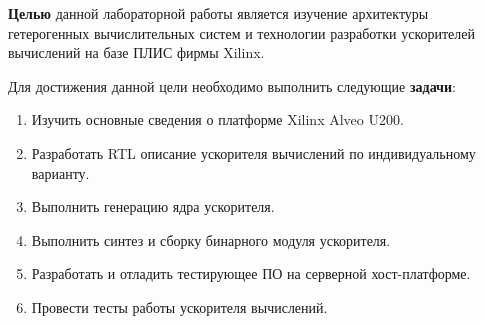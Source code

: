 \Introduction

\textbf{Целью} данной лабораторной работы является изучение архитектуры
гетерогенных вычислительных систем и технологии разработки ускорителей
вычислений на базе ПЛИС фирмы Xilinx.

Для достижения данной цели необходимо выполнить следующие \textbf{задачи}:

\begin{enumerate}
	\item Изучить основные сведения о платформе Xilinx Alveo U200.
	\item Разработать RTL описание ускорителя вычислений по индивидуальному
варианту.
	\item Выполнить генерацию ядра ускорителя.
	\item Выполнить синтез и сборку бинарного модуля ускорителя.
	\item Разработать и отладить тестирующее ПО на серверной хост-платформе.
	\item Провести тесты работы ускорителя вычислений.
\end{enumerate}
